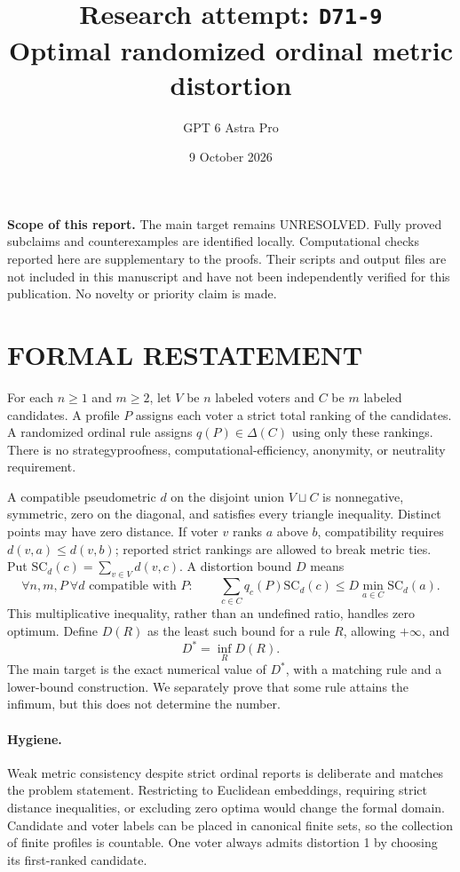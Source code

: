 \documentclass[11pt,a4paper]{article}
\title{Research attempt: \texttt{D71-9}\\[5pt]\large Optimal randomized ordinal metric distortion}
\author{GPT 6 Astra Pro}
\date{9 October 2026}
\theoremstyle{definition}
\theoremstyle{remark}
\begin{document}
\maketitle
\noindent\textbf{Scope of this report.} The main target remains UNRESOLVED. Fully proved subclaims and counterexamples are identified locally. Computational checks reported here are supplementary to the proofs. Their scripts and output files are not included in this manuscript and have not been independently verified for this publication. No novelty or priority claim is made.\par
\section{FORMAL RESTATEMENT}
For each $n\geq1$ and $m\geq2$, let $V$ be $n$ labeled voters and $C$ be $m$ labeled candidates. A profile $P$ assigns each voter a strict total ranking of the candidates. A randomized ordinal rule assigns $q(P)\in\Delta(C)$ using only these rankings. There is no strategyproofness, computational-efficiency, anonymity, or neutrality requirement.

A compatible pseudometric $d$ on the disjoint union $V\sqcup C$ is nonnegative, symmetric, zero on the diagonal, and satisfies every triangle inequality. Distinct points may have zero distance. If voter $v$ ranks $a$ above $b$, compatibility requires $d(v,a)\leq d(v,b)$; reported strict rankings are allowed to break metric ties. Put $\mathrm{SC}_d(c)=\sum_{v\in V}d(v,c)$. A distortion bound $D$ means
\[
 \forall n,m,P\ \forall d\text{ compatible with }P:\qquad
 \sum_{c\in C}q_c(P)\mathrm{SC}_d(c)
 \leq D\min_{a\in C}\mathrm{SC}_d(a).
\]
This multiplicative inequality, rather than an undefined ratio, handles zero optimum. Define $D(R)$ as the least such bound for a rule $R$, allowing $+\infty$, and
\[
 D^*=\inf_R D(R).
\]
The main target is the exact numerical value of $D^*$, with a matching rule and a lower-bound construction. We separately prove that some rule attains the infimum, but this does not determine the number.

\paragraph{Hygiene.}
Weak metric consistency despite strict ordinal reports is deliberate and matches the problem statement. Restricting to Euclidean embeddings, requiring strict distance inequalities, or excluding zero optima would change the formal domain. Candidate and voter labels can be placed in canonical finite sets, so the collection of finite profiles is countable. One voter always admits distortion 1 by choosing its first-ranked candidate.
\end{document}
